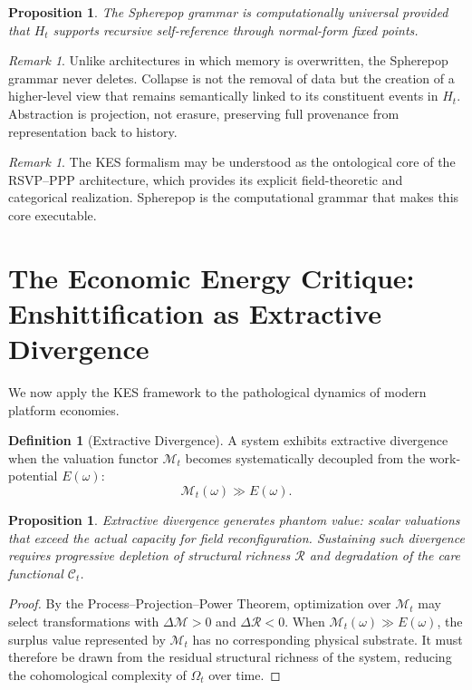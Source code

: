 \documentclass[11pt,a4paper]{article}
\newtheorem{proposition}[theorem]{Proposition}
\theoremstyle{definition}
\newtheorem{definition}[theorem]{Definition}
\theoremstyle{remark}
\newtheorem{remark}[theorem]{Remark}
\begin{document}
\begin{proposition}
The Spherepop grammar is computationally universal provided that $H_t$ supports recursive self-reference through normal-form fixed points.
\end{proposition}

\begin{remark}
Unlike architectures in which memory is overwritten, the Spherepop grammar never deletes. Collapse is not the removal of data but the creation of a higher-level view that remains semantically linked to its constituent events in $H_t$. Abstraction is projection, not erasure, preserving full provenance from representation back to history.
\end{remark}

\begin{remark}
The KES formalism may be understood as the ontological core of the RSVP--PPP architecture, which provides its explicit field-theoretic and categorical realization. Spherepop is the computational grammar that makes this core executable.
\end{remark}

\section{The Economic Energy Critique: Enshittification as Extractive Divergence}

We now apply the KES framework to the pathological dynamics of modern platform economies.

\begin{definition}[Extractive Divergence]
A system exhibits extractive divergence when the valuation functor $\mathcal{M}_t$ becomes systematically decoupled from the work-potential $E(\omega)$:
\[
\mathcal{M}_t(\omega) \gg E(\omega).
\]
\end{definition}

\begin{proposition}
Extractive divergence generates phantom value: scalar valuations that exceed the actual capacity for field reconfiguration. Sustaining such divergence requires progressive depletion of structural richness $\mathcal{R}$ and degradation of the care functional $\mathcal{C}_t$.
\end{proposition}

\begin{proof}
By the Process--Projection--Power Theorem, optimization over $\mathcal{M}_t$ may select transformations with $\Delta\mathcal{M} > 0$ and $\Delta\mathcal{R} < 0$. When $\mathcal{M}_t(\omega) \gg E(\omega)$, the surplus value represented by $\mathcal{M}_t$ has no corresponding physical substrate. It must therefore be drawn from the residual structural richness of the system, reducing the cohomological complexity of $\Omega_t$ over time.
\end{proof}
\end{document}
